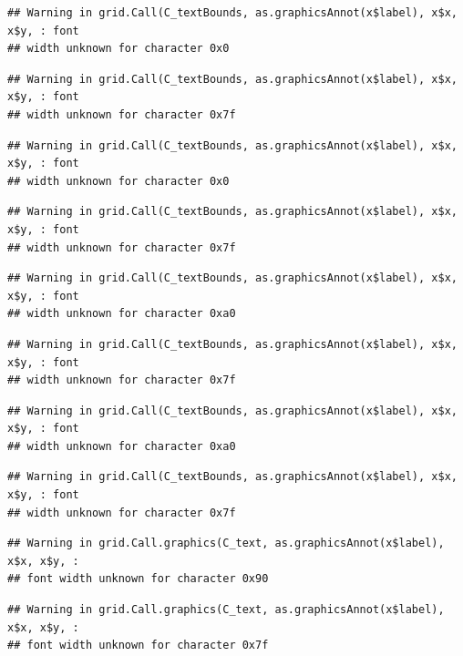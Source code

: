 \documentclass[]{article}
\begin{document}
\begin{verbatim}
## Warning in grid.Call(C_textBounds, as.graphicsAnnot(x$label), x$x, x$y, : font
## width unknown for character 0x0
\end{verbatim}

\begin{verbatim}
## Warning in grid.Call(C_textBounds, as.graphicsAnnot(x$label), x$x, x$y, : font
## width unknown for character 0x7f
\end{verbatim}

\begin{verbatim}
## Warning in grid.Call(C_textBounds, as.graphicsAnnot(x$label), x$x, x$y, : font
## width unknown for character 0x0
\end{verbatim}

\begin{verbatim}
## Warning in grid.Call(C_textBounds, as.graphicsAnnot(x$label), x$x, x$y, : font
## width unknown for character 0x7f
\end{verbatim}

\begin{verbatim}
## Warning in grid.Call(C_textBounds, as.graphicsAnnot(x$label), x$x, x$y, : font
## width unknown for character 0xa0
\end{verbatim}

\begin{verbatim}
## Warning in grid.Call(C_textBounds, as.graphicsAnnot(x$label), x$x, x$y, : font
## width unknown for character 0x7f
\end{verbatim}

\begin{verbatim}
## Warning in grid.Call(C_textBounds, as.graphicsAnnot(x$label), x$x, x$y, : font
## width unknown for character 0xa0
\end{verbatim}

\begin{verbatim}
## Warning in grid.Call(C_textBounds, as.graphicsAnnot(x$label), x$x, x$y, : font
## width unknown for character 0x7f
\end{verbatim}

\begin{verbatim}
## Warning in grid.Call.graphics(C_text, as.graphicsAnnot(x$label), x$x, x$y, :
## font width unknown for character 0x90
\end{verbatim}

\begin{verbatim}
## Warning in grid.Call.graphics(C_text, as.graphicsAnnot(x$label), x$x, x$y, :
## font width unknown for character 0x7f
\end{verbatim}
\end{document}
